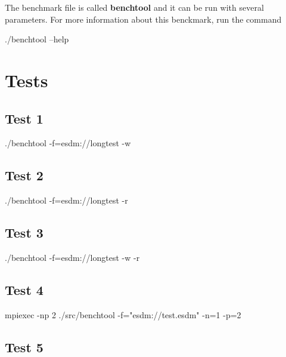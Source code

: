 The benchmark file is called \textbf{benchtool} and it can be run with several parameters. For more information about this benckmark, run the command

\begin{framed}
./benchtool --help
\end{framed}

\section{Tests}

\subsection{Test 1}

./benchtool -f=esdm://longtest -w

\subsection{Test 2}

./benchtool -f=esdm://longtest -r

\subsection{Test 3}

./benchtool -f=esdm://longtest -w -r

\subsection{Test 4}

mpiexec -np 2 ./src/benchtool -f="esdm://test.esdm" -n=1 -p=2

\subsection{Test 5}

